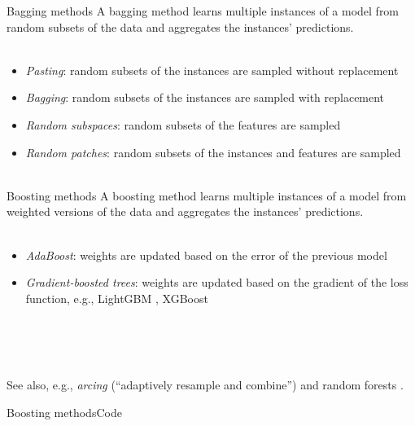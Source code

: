\documentclass[10pt]{beamer}
\begin{document}
\begin{frame}{Bagging methods}
  A bagging method learns multiple instances of a model from random subsets of
  the data and aggregates the instances' predictions.
  \\~\
  \begin{itemize}
    \item \emph{Pasting}: random subsets of the instances are sampled without replacement
          \parencite{Breiman1999}
    \item \emph{Bagging}: random subsets of the instances are sampled with replacement
          \parencite{Breiman1996}
    \item \emph{Random subspaces}: random subsets of the features are sampled
          \\ \parencite{Ho1998}
    \item \emph{Random patches}: random subsets of the instances and features
          are sampled \parencite{Louppe2012}
          \\~\
  \end{itemize}
  \parencite[][sec. 1.11.3]{zotero-3054}
\end{frame}

\begin{frame}{Boosting methods}
  A boosting method learns multiple instances of a model from weighted versions
  of the data and aggregates the instances' predictions.
  \\~\
  \begin{itemize}
    \item \emph{AdaBoost}: weights are updated based on the error of the
          previous model \parencite{Freund1997}
    \item \emph{Gradient-boosted trees}: weights are updated based on the
          gradient of the loss function, e.g., LightGBM \parencite{Ke2017},
          XGBoost \parencite{Chen2016} \\~\
  \end{itemize}
  \parencite[][sec. 1.11.1]{zotero-3054}
  \\~\

  See also, e.g., \emph{arcing} (``adaptively resample and combine'') and random
  forests \parencite{Breiman1998,Breiman2001}.
\end{frame}

\begin{frame}{Boosting methods}{Code}
  
\end{frame}
\end{document}
